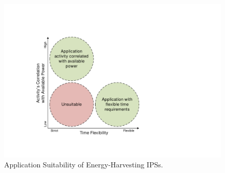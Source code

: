 \begin{figure}[!htb]
  \centering
  \includegraphics[width=0.7\columnwidth]{figure/intro/appsuit2}
  \caption{Application Suitability of Energy-Harvesting IPSs.}
  \label{Figure:appsuit}
\end{figure}




